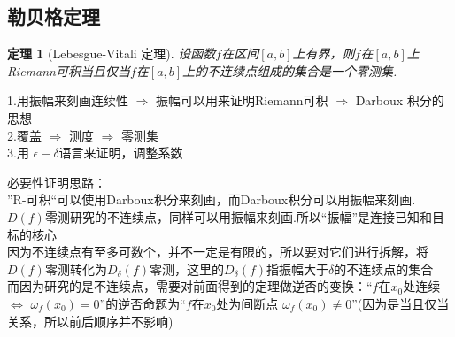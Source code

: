 \documentclass[12pt, a4paper, oneside]{ctexart}
\newtheorem{theorem}{定理}[section]
\begin{document}
\subsection{勒贝格定理}

\begin{theorem}[Lebesgue-Vitali 定理]
设函数$f$在区间$[a,b]$上有界，则$f$在$[a,b]$上Riemann可积当且仅当$f$在$[a,b]$上的不连续点组成的集合是一个零测集.
\end{theorem}

\begin{note}
1.用振幅来刻画连续性 $\Rightarrow$ 振幅可以用来证明Riemann可积 $\Rightarrow$ Darboux 积分的思想\\
2.覆盖 $\Rightarrow$ 测度 $\Rightarrow$ 零测集\\
3.用 $\epsilon-\delta $语言来证明，调整系数
\end{note}

\begin{note}
必要性证明思路：\\
”R-可积“可以使用Darboux积分来刻画，而Darboux积分可以用振幅来刻画.$D(f)$零测研究的不连续点，同样可以用振幅来刻画.所以“振幅”是连接已知和目标的核心\\
因为不连续点有至多可数个，并不一定是有限的，所以要对它们进行拆解，将$D(f)$零测转化为$D_{\delta}(f)$零测，这里的$D_{\delta}(f)$指振幅大于$\delta$的不连续点的集合\\
而因为研究的是不连续点，需要对前面得到的定理做逆否的变换：“$f$在$x_0$处连续$\Leftrightarrow$ $\omega_{f}(x_0)=0$”的逆否命题为“$f$在$x_0$处为间断点 \Leftrightarrow $\omega_{f}(x_0) \neq 0$”(因为是当且仅当关系，所以前后顺序并不影响)
\end{note}
\end{document}
